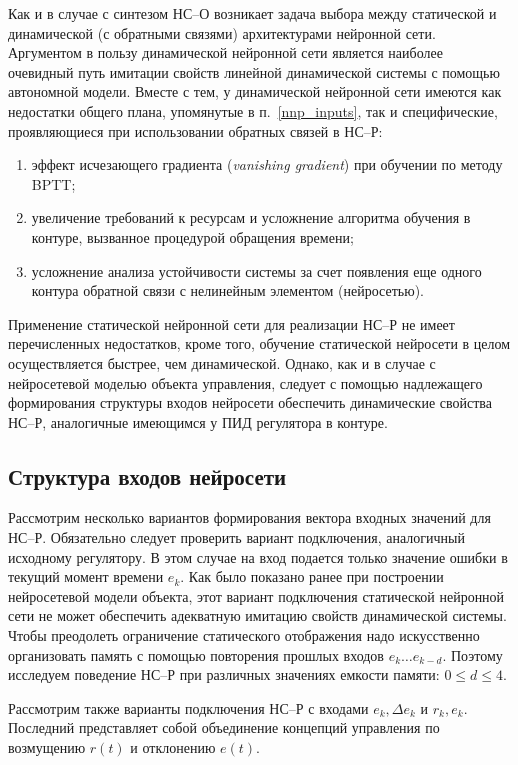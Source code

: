 Как и в случае с синтезом НС--О возникает задача выбора между
статической и динамической (с обратными связями) архитектурами
нейронной сети.  Аргументом в пользу динамической нейронной сети
является наиболее очевидный путь имитации свойств линейной
динамической системы с помощью автономной модели.  Вместе с тем, у
динамической нейронной сети имеются как недостатки общего плана,
упомянутые в п.~\ref{nnp_inputs}, так и специфические, проявляющиеся
при использовании обратных связей в НС--Р:

\begin{enumerate}
\item эффект исчезающего градиента ({\em vanishing gradient}) при
      обучении по методу BPTT;
\item увеличение требований к ресурсам и усложнение алгоритма обучения
      в контуре, вызванное процедурой обращения времени;
\item усложнение анализа устойчивости системы за счет появления еще
      одного контура обратной связи с нелинейным элементом (нейросетью).
\end{enumerate}

Применение статической нейронной сети для реализации НС--Р не имеет
перечисленных недостатков, кроме того, обучение статической нейросети
в целом осуществляется быстрее, чем динамической.  Однако, как и в
случае с нейросетевой моделью объекта управления, следует с помощью
надлежащего формирования структуры входов нейросети обеспечить
динамические свойства НС--Р, аналогичные имеющимся у ПИД регулятора в
контуре.

\subsection{Структура входов нейросети}

Рассмотрим несколько вариантов формирования вектора входных значений
для НС--Р.  Обязательно следует проверить вариант подключения,
аналогичный исходному регулятору.  В этом случае на вход подается
только значение ошибки в текущий момент времени $e_k$.  Как было
показано ранее при построении нейросетевой модели объекта, этот
вариант подключения статической нейронной сети не может обеспечить
адекватную имитацию свойств динамической системы.  Чтобы преодолеть
ограничение статического отображения надо искусственно организовать
память с помощью повторения прошлых входов $e_k\ldots e_{k-d}$.
Поэтому исследуем поведение НС--Р при различных значениях емкости
памяти: $0\le d\le 4$.

Рассмотрим также варианты подключения НС--Р с входами $e_k,\Delta e_k$
и $r_k,e_k$.  Последний представляет собой объединение концепций
управления по возмущению $r(t)$ и отклонению $e(t)$.

